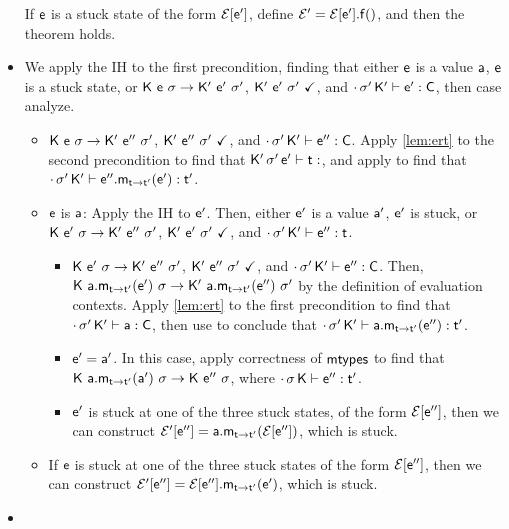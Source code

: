\documentclass[acmlarge, anonymous, authordraft]{acmart}
\begin{document}
\begin{itemize}
        If ${\sf{e}}$ is a stuck state of the form $\mathcal{E}[{{{\sf{e'}}}}]$, define $\mathcal{E}' = \mathcal{E}[{{{\sf{e'}}}}].{\sf{f}}()$, and then the theorem holds.

  \item {}

      We apply the IH to the first precondition, finding that either ${\sf{e}}$ is a value ${\sf{a}}$, ${\sf{e}}$ is a stuck state, or ${{\sf{K}}}~{{\sf{e}}}~{\sigma} \rightarrow {{\ensuremath{{\sf{K'}}}}}~{{{{\sf{e'}}}}}~{{{\sigma'}}}$, ${{\sf{K'}}}~{{{\sf{e'}}}}~{{\sigma'}}~\checkmark$, and $\cdot\,{{\sigma'}}\,{{\sf{K'}}}\vdash {{\ensuremath{{\sf{e'}}}}} : {\sf{C}}$, then case analyze.
      \begin{itemize}
        \item ${{\sf{K}}}~{{\sf{e}}}~{\sigma} \rightarrow {{\ensuremath{{\sf{K'}}}}}~{{{{\sf{e''}}}}}~{{{\sigma'}}}$, ${{\sf{K'}}}~{{{\sf{e''}}}}~{{\sigma'}}~\checkmark$, and $\cdot\,{{\sigma'}}\,{{\sf{K'}}}\vdash {{\ensuremath{{\sf{e''}}}}} : {\sf{C}}$. Apply \ref{lem:ert} to the second precondition to find that $\EnvType\Kp\sp\ep\t$, and apply  to find that $\EnvType\cdot\sp\Kp{\KCall\epp\m\ep\t\tp}\tp$.
        \item ${\sf{e}}$ is ${\sf{a}}$: Apply the IH to ${\sf{e}}'$. Then, either ${\sf{e}}'$ is a value ${\sf{a}}'$, ${\sf{e}}'$ is stuck, or ${{\sf{K}}}~{{{{\sf{e'}}}}}~{\sigma} \rightarrow {{\ensuremath{{\sf{K'}}}}}~{{{{\sf{e''}}}}}~{{{\sigma'}}}$, ${{\sf{K'}}}~{{{\sf{e'}}}}~{{\sigma'}}~\checkmark$, and $\EnvType\cdot\sp\Kp\epp\t$. 
        \begin{itemize}
          \item ${{\sf{K}}}~{{{{\sf{e'}}}}}~{\sigma} \rightarrow {{\ensuremath{{\sf{K'}}}}}~{{{{\sf{e''}}}}}~{{{\sigma'}}}$, ${{\sf{K'}}}~{{{\sf{e''}}}}~{{\sigma'}}~\checkmark$, and $\cdot\,{{\sigma'}}\,{{\sf{K'}}}\vdash {{\ensuremath{{\sf{e''}}}}} : {\sf{C}}$. Then, $\Reduce\K{\KCall\a\m\ep\t\tp}\s\Kp{\KCall\a\m\epp\t\tp}\sp$ by the definition of evaluation contexts. Apply \ref{lem:ert} to the first precondition to find that $\cdot\,{{\sigma'}}\,{{\sf{K'}}}\vdash {\sf{a}} : {\sf{C}}$, then use  to conclude that $\EnvType\cdot\sp\Kp{\KCall\a\m\epp\t\tp}\tp$.
          \item ${\sf{e}}' = {\sf{a}}'$. In this case, apply correctness of ${\sf{mtypes}}$ to find that $\Reduce\K{\KCall\a\m\ap\t\tp}\s\K\epp\s$, where $\EnvType\cdot\s\K\epp\tp$.
          \item ${\sf{e}}'$ is stuck at one of the three stuck states, of the form $\mathcal{E}[{{{\sf{e''}}}}]$, then we can construct $\EE'[\epp] = \KCall\a\m{\EE[\epp]}\t\tp$, which is stuck.
        \end{itemize}
        \item If ${\sf{e}}$ is stuck at one of the three stuck states of the form $\mathcal{E}[{{{\sf{e''}}}}]$, then we can construct $\EE'[\epp] = \KCall{\EE[\epp]}\m{\ep}\t\tp$, which is stuck.
      \end{itemize}
  
  \item {}
  

\end{itemize}
\end{document}
